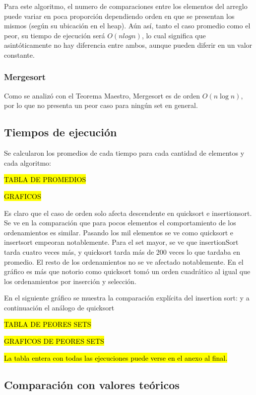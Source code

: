\documentclass[article,a4paper]{article}
\begin{document}
Para este algoritmo, el numero de comparaciones entre los elementos del arreglo puede variar en poca proporción dependiendo orden en que se presentan los mismos (según su ubicación en el heap). Aún así, tanto el caso promedio como el peor, su tiempo de ejecución será $O(n log n)$, lo cual significa que asintóticamente no hay diferencia entre ambos, aunque pueden diferir en un valor constante.

\subsubsection{Mergesort}

Como se analizó con el Teorema Maestro, Mergesort es de orden $O(n \log n)$, por lo que no presenta un peor caso para ningún set en general.

\subsection{Tiempos de ejecución}

Se calcularon los promedios de cada tiempo para cada cantidad de elementos y cada algoritmo:

\hl{TABLA DE PROMEDIOS}

\hl{GRAFICOS}

Es claro que el caso de orden solo afecta descendente en quicksort e insertionsort.
Se ve en la comparación que para pocos elementos el comportamiento de los ordenamientos es similar. Pasando los mil elementos se ve como quicksort e insertsort empeoran notablemente. Para el set mayor, se ve que insertionSort tarda cuatro veces más, y quicksort tarda más de 200 veces lo que tardaba en promedio. El resto de los ordenamientos no se ve afectado notablemente.
En el gráfico es más que notorio como quicksort tomó un orden cuadrático al igual que los ordenamientos por inserción y selección.

En el siguiente gráfico se muestra la comparación explícita del insertion sort:
y a continuación el análogo de quicksort

\hl{TABLA DE PEORES SETS}

\hl{GRAFICOS DE PEORES SETS}

\hl{La tabla entera con todas las ejecuciones puede verse en el anexo al final.}


\subsection{Comparación con valores teóricos}
\end{document}
